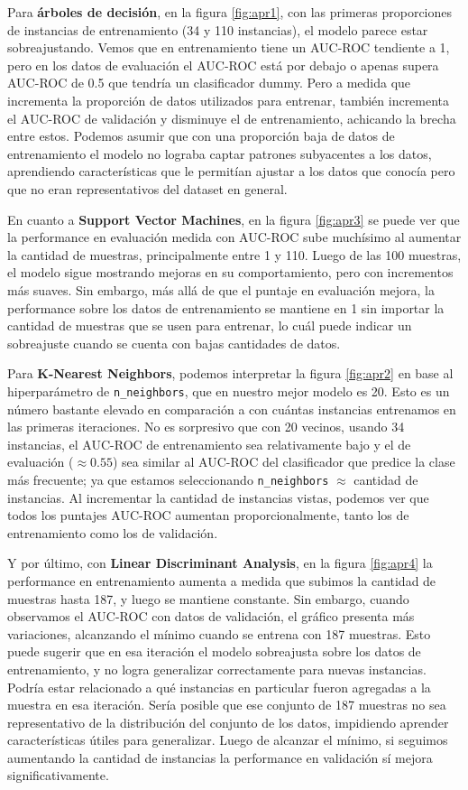 Para \textbf{árboles de decisión}, en la figura \ref{fig:apr1}, con las primeras proporciones de instancias de entrenamiento (34 y 110 instancias), el modelo parece estar sobreajustando. Vemos que en entrenamiento tiene un AUC-ROC tendiente a 1, pero en los datos de evaluación el AUC-ROC está por debajo o apenas supera AUC-ROC de 0.5 que tendría un clasificador dummy. Pero a medida que incrementa la proporción de datos utilizados para entrenar, también incrementa el AUC-ROC de validación y disminuye el de entrenamiento, achicando la brecha entre estos. Podemos asumir que con una proporción baja de datos de entrenamiento el modelo no lograba captar patrones subyacentes a los datos, aprendiendo características que le permitían ajustar a los datos que conocía pero que no eran representativos del dataset en general.

En cuanto a \textbf{Support Vector Machines}, en la figura \ref{fig:apr3} se puede ver que la performance en evaluación medida con AUC-ROC sube muchísimo al aumentar la cantidad de muestras, principalmente entre 1 y 110. Luego de las 100 muestras, el modelo sigue mostrando mejoras en su comportamiento, pero con incrementos más suaves. Sin embargo, más allá de que el puntaje en evaluación mejora, la performance sobre los datos de entrenamiento se mantiene en 1 sin importar la cantidad de muestras que se usen para entrenar, lo cuál puede indicar un sobreajuste cuando se cuenta con bajas cantidades de datos.

Para \textbf{K-Nearest Neighbors}, podemos interpretar la figura \ref{fig:apr2} en base al hiperparámetro de \texttt{n\_neighbors}, que en nuestro mejor modelo es 20. Esto es un número bastante elevado en comparación a con cuántas instancias entrenamos en las primeras iteraciones. No es sorpresivo que con 20 vecinos, usando 34 instancias, el AUC-ROC de entrenamiento sea relativamente bajo y el de evaluación ($\approx 0.55$) sea similar al AUC-ROC del clasificador que predice la clase más frecuente; ya que estamos seleccionando \texttt{n\_neighbors} $\approx$ cantidad de instancias. Al incrementar la cantidad de instancias vistas, podemos ver que todos los puntajes AUC-ROC aumentan proporcionalmente, tanto los de entrenamiento como los de validación.


Y por último, con \textbf{Linear Discriminant Analysis}, en la figura \ref{fig:apr4} la performance en entrenamiento aumenta a medida que subimos la cantidad de muestras hasta 187, y luego se mantiene constante. Sin embargo, cuando observamos el AUC-ROC con datos de validación, el gráfico presenta más variaciones, alcanzando el mínimo cuando se entrena con 187 muestras. Esto puede sugerir que en esa iteración el modelo sobreajusta sobre los datos de entrenamiento, y no logra generalizar correctamente para nuevas instancias. Podría estar relacionado a qué instancias en particular fueron agregadas a la muestra en esa iteración. Sería posible que ese conjunto de 187 muestras no sea representativo de la distribución del conjunto de los datos, impidiendo aprender características útiles para generalizar. Luego de alcanzar el mínimo, si seguimos aumentando la cantidad de instancias la performance en validación sí mejora significativamente.


